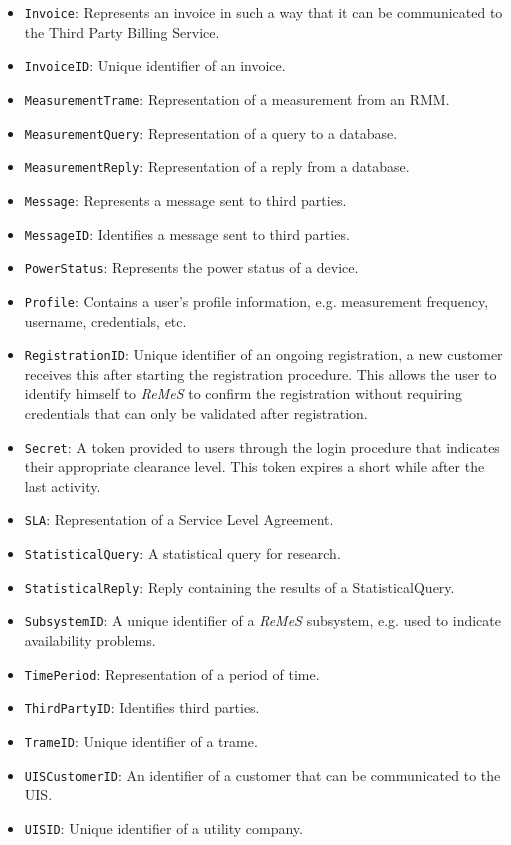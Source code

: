 \documentclass[a4paper,10pt]{article}
\newcommand{\rem}{\emph{ReMeS}\xspace}
\begin{document}
\begin{itemize}
    \item \texttt{Invoice}: Represents an invoice in such a way that it can be communicated to the Third Party Billing Service.
    \item \texttt{InvoiceID}: Unique identifier of an invoice.
	\item \texttt{MeasurementTrame}: Representation of a measurement from an RMM.
	\item \texttt{MeasurementQuery}: Representation of a query to a database.
    \item \texttt{MeasurementReply}: Representation of a reply from a database.
    \item \texttt{Message}: Represents a message sent to third parties.
    \item \texttt{MessageID}: Identifies a message sent to third parties.
    \item \texttt{PowerStatus}: Represents the power status of a device.
    \item \texttt{Profile}: Contains a user's profile information, e.g. measurement frequency, username, credentials, etc.
    \item \texttt{RegistrationID}: Unique identifier of an ongoing registration, a new customer receives this after starting the registration procedure. This allows the user to identify himself to \rem to confirm the registration without requiring credentials that can only be validated after registration.
    \item \texttt{Secret}: A token provided to users through the login procedure that indicates their appropriate clearance level. This token expires a short while after the last activity.
    \item \texttt{SLA}: Representation of a Service Level Agreement.
    \item \texttt{StatisticalQuery}: A statistical query for research.
    \item \texttt{StatisticalReply}: Reply containing the results of a StatisticalQuery.
    \item \texttt{SubsystemID}: A unique identifier of a \rem subsystem, e.g. used to indicate availability problems.
    \item \texttt{TimePeriod}: Representation of a period of time.
    \item \texttt{ThirdPartyID}: Identifies third parties.
    \item \texttt{TrameID}: Unique identifier of a trame.
    \item \texttt{UISCustomerID}: An identifier of a customer that can be communicated to the UIS.
    \item \texttt{UISID}: Unique identifier of a utility company.
\end{itemize}
\end{document}
